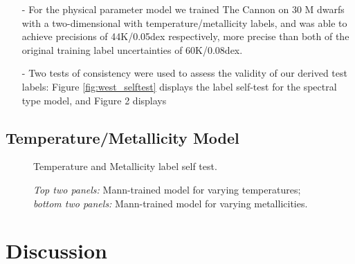 \documentclass[modern]{aastex62}
\begin{document}
\begin{enumerate}
\item[-] For the physical parameter model we trained The Cannon on 30 M dwarfs with a two-dimensional with temperature/metallicity labels, and was able to achieve precisions of 44K/0.05dex respectively, more precise than both of the original training label uncertainties of 60K/0.08dex.

\item[-] Two tests of consistency were used to assess the validity of our derived test labels: Figure \ref{fig:west_selftest} displays the label self-test for the spectral type model, and Figure 2 displays 
\end{enumerate}



\subsection{Temperature/Metallicity Model}
\begin{figure}[ht]
\caption{Temperature and Metallicity label self test.} \label{fig:mann_selftest}
\end{figure}

\begin{figure}[ht]
\caption{\textit{Top two panels:} Mann-trained model for varying temperatures; \textit{bottom two panels:} Mann-trained model for varying metallicities.} \label{fig:mann_demo}
\end{figure}


\section{Discussion} \label{sec:discussion}
\end{document}
